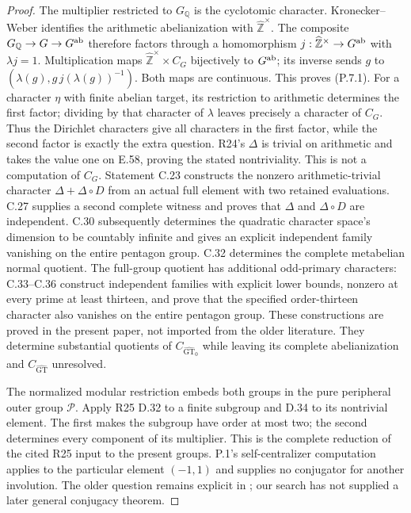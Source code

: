 \begin{proof}
The multiplier restricted to $G_{\mathbb Q}$ is the
cyclotomic character. Kronecker--Weber identifies the
arithmetic abelianization with
$\widehat{\mathbb Z}^{\times}$. The composite
$G_{\mathbb Q}\to G\to G^{\rm ab}$ therefore factors
through a homomorphism
$j:\widehat{\mathbb Z}^{\times}\to G^{\rm ab}$ with
$\lambda j=1$. Multiplication maps
$\widehat{\mathbb Z}^{\times}\times C_G$ bijectively
to $G^{\rm ab}$; its inverse sends $g$ to
$(\lambda(g),g\,j(\lambda(g))^{-1})$. Both maps are
continuous. This proves (P.7.1).
For a character $\eta$ with finite abelian target,
its restriction to arithmetic determines the first
factor; dividing by that character of $\lambda$
leaves precisely a character of $C_G$. Thus the
Dirichlet characters give all characters in the first
factor, while the second factor is exactly the extra
question. R24's $\Delta$ is trivial on arithmetic and
takes the value one on E.58, proving the stated
nontriviality. This is not a computation of $C_G$.
Statement C.23 constructs the nonzero arithmetic-trivial character
$\Delta+\Delta\circ D$ from an actual full element with two
retained evaluations. C.27 supplies a second complete witness
and proves that $\Delta$ and $\Delta\circ D$ are independent.
C.30 subsequently determines the quadratic character space's
dimension to be countably infinite and gives an explicit
independent family vanishing on the entire pentagon group.
C.32 determines the complete metabelian normal quotient.
The full-group quotient has additional odd-primary characters:
C.33--C.36 construct independent families with explicit lower
bounds, nonzero at every prime at least thirteen, and prove
that the specified order-thirteen character also vanishes on
the entire pentagon group. These constructions are proved
in the present paper, not imported from the older literature.
They determine substantial quotients of
$C_{\widehat{\mathrm{GT}}_0}$ while leaving its complete
abelianization and $C_{\widehat{\mathrm{GT}}}$ unresolved.

The normalized modular restriction embeds both groups
in the pure peripheral outer group $\mathcal P$.
Apply R25 D.32 to a finite subgroup and D.34 to its
nontrivial element. The first makes the subgroup have
order at most two; the second determines every
component of its multiplier. This is the complete
reduction of the cited R25 input to the present groups.
P.1's self-centralizer computation applies to the
particular element $(-1,1)$ and supplies no conjugator
for another involution. The older question remains
explicit in \cite[\S1.4, questions (2), (4)]{PBC_SchnepsSurvey};
our search has not supplied a later general conjugacy
theorem.


\end{proof}
